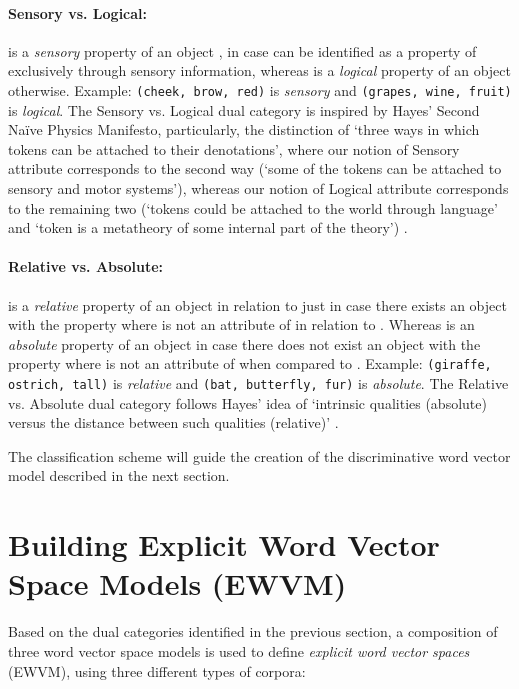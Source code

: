 \documentclass[11pt,a4paper]{article}
\begin{document}
\paragraph{Sensory vs. Logical:}  is a \emph{sensory} property of an object , in case  can be identified as a property of  exclusively through sensory information, whereas  is a \emph{logical} property of an object  otherwise. Example: \texttt{(cheek, brow, red)} is \emph{sensory} and \texttt{(grapes, wine, fruit)} is \emph{logical}. The Sensory vs. Logical dual category is inspired by Hayes' Second Na{\"i}ve Physics Manifesto, particularly, the distinction of `three ways in which tokens can be attached to their denotations', where our notion of Sensory attribute corresponds to the second way (`some of the tokens can be attached to sensory and motor systems'), whereas our notion of Logical attribute corresponds to the remaining two (`tokens could be attached to the world through language' and `token is a metatheory of some internal part of the theory') \cite{hayes:1}.

\paragraph{Relative vs. Absolute:}  is a \emph{relative} property of an object  in relation to  just in case there exists an object  with the property  where  is not an attribute of  in relation to . Whereas  is an \emph{absolute} property of an object  in case there does not exist an object  with the property  where  is not an attribute of  when compared to . Example: \texttt{(giraffe, ostrich, tall)} is \emph{relative} and \texttt{(bat, butterfly, fur)} is \emph{absolute}. The Relative vs. Absolute dual category follows Hayes' idea of `intrinsic qualities (absolute) versus the distance between such qualities (relative)' \cite{hayes:1}.



The classification scheme will guide the creation of the discriminative word vector model described in the next section.

\section{Building Explicit Word Vector Space Models (EWVM)}

Based on the dual categories identified in the previous section, a composition of three word vector space models is used to define \emph{explicit word vector spaces} (EWVM), using three different types of corpora:
\end{document}
